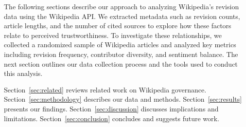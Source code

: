 The following sections describe our approach to analyzing Wikipedia’s revision data using the Wikipedia API. We extracted metadata such as revision counts, article lengths,
 and the number of cited sources to explore how these factors relate to perceived trustworthiness. To investigate these relationships, we collected a randomized sample of 
 Wikipedia articles and analyzed key metrics including revision frequency, contributor diversity, and sentiment balance. The next section outlines our data collection 
 process and the tools used to conduct this analysis.
 
Section~\ref{sec:related} reviews related work on Wikipedia governance. 
Section~\ref{sec:methodology} describes our data and methods.
Section~\ref{sec:results} presents our findings.
Section~\ref{sec:discussion} discusses implications and limitations.
Section~\ref{sec:conclusion} concludes and suggests future work.

